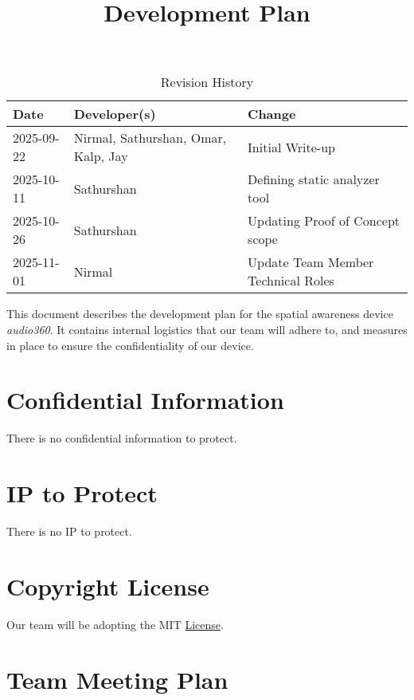 \documentclass{article}
\title{Development Plan\\\progname}
\author{\authname}
\date{}
\begin{document}
\maketitle

\newpage{}

\begin{table}[hp]
\caption{Revision History} \label{TblRevisionHistory}
\begin{tabularx}{\textwidth}{llX}
\toprule
\textbf{Date} & \textbf{Developer(s)} & \textbf{Change}\\
\midrule
2025-09-22 & Nirmal, Sathurshan, Omar, Kalp, Jay & Initial Write-up\\
2025-10-11 & Sathurshan & Defining static analyzer tool\\
2025-10-26 & Sathurshan & Updating Proof of Concept scope\\
2025-11-01 & Nirmal & Update Team Member Technical Roles \\
\bottomrule
\end{tabularx}
\end{table}

\newpage

\tableofcontents

\newpage{}

This document describes the development plan for the spatial awareness device
\textit{audio360}. It contains internal logistics that our team will adhere to,
and measures in place to ensure the confidentiality of our device.

\section{Confidential Information}

There is no confidential information to protect.

\section{IP to Protect}

There is no IP to protect.

\section{Copyright License}

Our team will be adopting the MIT
\href{https://github.com/Nirmal-code/SixSense/blob/main/LICENSE}{License}.

\section{Team Meeting Plan}
\end{document}
